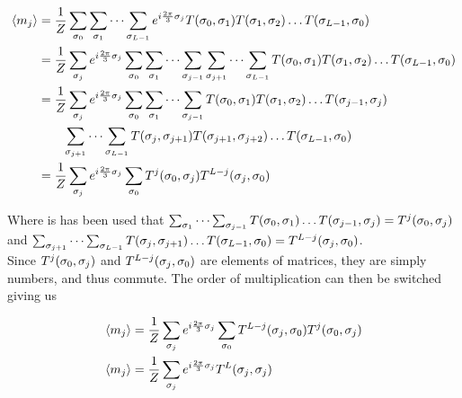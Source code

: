 \documentclass[12pt]{article}
\begin{document}
\begin{align*}
    \expval{m_j} &= \frac{1}{Z}\sum_{\sigma_0}\sum_{\sigma_1}\dots\sum_{\sigma_{L-1}}
    e^{i\frac{2\pi}{3}\sigma_j} T\qty(\sigma_0, \sigma_1)T\qty(\sigma_1,
    \sigma_2)\dots T\qty(\sigma_{L-1},\sigma_0) \\
    &= \frac{1}{Z}\sum_{\sigma_j}e^{i\frac{2\pi}{3}\sigma_j}
    \sum_{\sigma_0}\sum_{\sigma_1}\dots\sum_{\sigma_{j-1}}\sum_{\sigma_{j+1}}\dots
    \sum_{\sigma_{L-1}}T\qty(\sigma_0, \sigma_1)T\qty(\sigma_1, \sigma_2) \dots
    T\qty(\sigma_{L-1}, \sigma_0) \\
    &= \frac{1}{Z}\sum_{\sigma_j}e^{i\frac{2\pi}{3}\sigma_j}
    \sum_{\sigma_0}\sum_{\sigma_1}\dots\sum_{\sigma_{j-1}}T\qty(\sigma_0,
    \sigma_1)T\qty(\sigma_1, \sigma_2)\dots T\qty(\sigma_{j-1}, \sigma_j) \\
    &\qquad\sum_{\sigma_{j+1}}\dots\sum_{\sigma_{L-1}} T\qty(\sigma_j,
    \sigma_{j+1})T\qty(\sigma_{j+1}, \sigma_{j+2})\dots T\qty(\sigma_{L-1},
    \sigma_0) \\
    &=\frac{1}{Z}\sum_{\sigma_j}e^{i\frac{2\pi}{3}\sigma_j}
    \sum_{\sigma_0}T^{j}\qty(\sigma_0, \sigma_j)T^{L-j}\qty(\sigma_j,
    \sigma_0)
\end{align*}

Where is has been used that
$\sum_{\sigma_1}\dots\sum_{\sigma_{j-1}}T\qty(\sigma_0,\sigma_1)\dots
T\qty(\sigma_{j-1}, \sigma_j) = T^{j}\qty(\sigma_0, \sigma_j)$ and 
$\sum_{\sigma_{j+1}}\dots\sum_{\sigma_{L-1}} T\qty(\sigma_j,
\sigma_{j+1})\dots T\qty(\sigma_{L-1},\sigma_0) = T^{L-j}\qty(\sigma_j,
\sigma_0)$. \\
Since $T^{j}\qty(\sigma_0, \sigma_j)$ and
$T^{L-j}\qty(\sigma_j,\sigma_0)$ are elements of matrices, they are simply
numbers, and thus commute. The order of multiplication can then be switched
giving us

\begin{align*}
    \expval{m_j} &= \frac{1}{Z}\sum_{\sigma_j}e^{i\frac{2\pi}{3}\sigma_j}
    \sum_{\sigma_0}T^{L-j}\qty(\sigma_j, \sigma_0)T^{j}\qty(\sigma_0,
    \sigma_j) \\
    \expval{m_j} &= \frac{1}{Z}\sum_{\sigma_j}e^{i\frac{2\pi}{3}\sigma_j}T^L\qty(\sigma_j,
    \sigma_j)
\end{align*}
\end{document}
